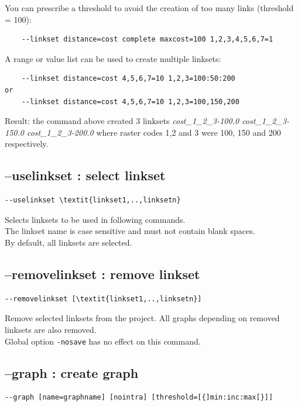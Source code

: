 \documentclass[a4paper,10pt]{report}
\begin{document}
You can prescribe a threshold to avoid the creation of too many links (threshold = 100):
\begin{Verbatim}
	--linkset distance=cost complete maxcost=100 1,2,3,4,5,6,7=1
\end{Verbatim}

A range or value list can be used to create multiple linksets:
\begin{Verbatim}
	--linkset distance=cost 4,5,6,7=10 1,2,3=100:50:200
or
	--linkset distance=cost 4,5,6,7=10 1,2,3=100,150,200
\end{Verbatim}
Result: the command above created 3 linksets \textit{cost\_1\_2\_3-100.0 cost\_1\_2\_3-150.0 cost\_1\_2\_3-200.0}
where raster codes 1,2 and 3 were 100, 150 and 200 respectively.


\subsection{--uselinkset : select linkset}
\label{uselinkset}
\begin{Verbatim}[commandchars=\\\{\}]
--uselinkset \textit{linkset1,..,linksetn}
\end{Verbatim}
Selects linksets to be used in following commands.\\
The linkset name is case sensitive and must not contain blank spaces.\\
By default, all linksets are selected.

\subsection{--removelinkset : remove linkset}
\begin{Verbatim}[commandchars=\\\{\}]
--removelinkset [\textit{linkset1,..,linksetn}]
\end{Verbatim}
Remove selected linksets from the project. All graphs depending on removed linksets are also removed.\\
Global option \verb|-nosave| has no effect on this command.


\subsection{--graph : create graph}
\begin{Verbatim}
--graph [name=graphname] [nointra] [threshold=[{]min:inc:max[}]]
\end{Verbatim}
\end{document}
